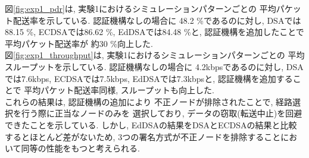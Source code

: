 \indent 図\ref{fig:exp1_pdr}は, 実験1におけるシミュレーションパターンごとの
平均パケット配送率を示している. 認証機構なしの場合に
48.2 \%であるのに対し, DSAでは88.15 \%, 
ECDSAでは86.62 \%, EdDSAでは84.48 \%と, 
認証機構を追加したことで平均パケット配送率が
約30 \%向上した. \\
\indent 図\ref{fig:exp1_throughput}は, 実験1におけるシミュレーションパターンごとの
平均スループットを示している. 認証機構なしの場合に
4.2kbpsであるのに対し, 
DSAでは7.6kbps, ECDSAでは7.5kbps,
EdDSAでは7.3kbpsと, 認証機構を追加することで
平均パケット配送率同様, スループットも向上した. \\
\indent これらの結果は, 認証機構の追加により 
不正ノードが排除されたことで, 経路選択を行う際に正当なノードのみを
選択しており,  データの窃取(転送中止)を回避できたことを示している. 
しかし, EdDSAの結果をDSAとECDSAの結果と比較するとほとんど差がないため, 
3つの署名方式が不正ノードを排除することにおいて同等の性能をもつと考えられる. 



